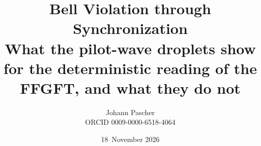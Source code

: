 \documentclass[11pt,a4paper]{report}
\title{Bell Violation through Synchronization\\[0.5em]
  \large What the pilot-wave droplets show for the deterministic reading of the FFGFT, and what they do not}
\date{18~November 2026}
\author{Johann Pascher\\\small ORCID 0009-0000-6518-4064}
\begin{document}
\renewcommand{\thechapter}{}
\renewcommand{\thesection}{\arabic{section}}
\maketitle
\tableofcontents

\end{document}
